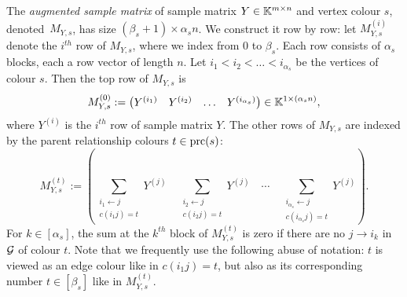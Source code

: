 \begin{defn} \label{defn:MYs} %
	The {\em augmented sample matrix} of sample matrix $Y \in \mathbb K^{m \times n}$ and vertex colour $s$, denoted~$M_{Y,s}$, has size $(\beta_s +1) \times \alpha_s n$. We construct it row by row: let $M_{Y,s}^{(i)}$ denote the $i^{th}$ row of $M_{Y,s}$, where we index from $0$ to $\beta_s$.
	Each row consists of $\alpha_s$ blocks, each a row vector of length $n$.
	Let $i_1 < i_2 < \ldots < i_{\alpha_s}$ be the vertices of colour $s$.
	Then the top row of $M_{Y,s}$ is 
		\[ M^{(0)}_{Y,s} := \begin{pmatrix} Y^{(i_1)} & Y^{(i_2)} & \ldots & Y^{(i_{\alpha_s})} \end{pmatrix} \in \mathbb K^{1 \times (\alpha_s n)},\]
	where $Y^{(i)}$ is the $i^{th}$ row of sample matrix $Y$.
	The other rows of $M_{Y,s}$ are indexed by the parent relationship colours $t \in \operatorname{prc}(s)$:
		\[ M^{(t)}_{Y,s} := \left( \sum_{\substack{i_1 \leftarrow j \\ c(i_1 j) = t}} Y^{(j)} \quad \sum_{\substack{i_2 \leftarrow j \\ c(i_2 j) = t}} Y^{(j)}  \quad \cdots \quad \sum_{\substack{i_{\alpha_s} \leftarrow j \\ c(i_{\alpha_s} j) = t}} Y^{(j)}  \right) .\]
	For $k \in [\alpha_s]$, the sum at the $k^{th}$ block of $M^{(t)}_{Y,s}$ is zero if there are no $j \to i_k$ in $\mathcal{G}$ of colour $t$.
	Note that we frequently use the following abuse of notation: $t$ is viewed as an edge colour like in $c(i_1 j) = t$, but also as its corresponding number $t \in [\beta_s]$ like in $M^{(t)}_{Y,s}$.
	\hfill{}
\end{defn}


